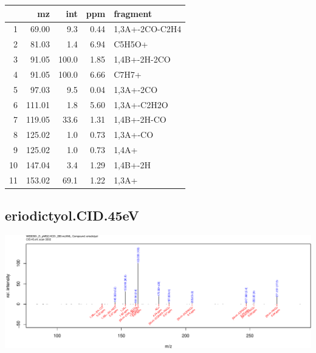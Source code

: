 \documentclass[]{article}
\begin{document}
\begin{table}[ht]
\centering
\begin{tabular}{rrrrl}
  \toprule
 & mz & int & ppm & fragment \\ 
  \midrule
1 & 69.00 & 9.3 & 0.44 & 1,3A+-2CO-C2H4 \\ 
  2 & 81.03 & 1.4 & 6.94 & C5H5O+ \\ 
  3 & 91.05 & 100.0 & 1.85 & 1,4B+-2H-2CO \\ 
  4 & 91.05 & 100.0 & 6.66 & C7H7+ \\ 
  5 & 97.03 & 9.5 & 0.04 & 1,3A+-2CO \\ 
  6 & 111.01 & 1.8 & 5.60 & 1,3A+-C2H2O \\ 
  7 & 119.05 & 33.6 & 1.31 & 1,4B+-2H-CO \\ 
  8 & 125.02 & 1.0 & 0.73 & 1,3A+-CO \\ 
  9 & 125.02 & 1.0 & 0.73 & 1,4A+ \\ 
  10 & 147.04 & 3.4 & 1.29 & 1,4B+-2H \\ 
  11 & 153.02 & 69.1 & 1.22 & 1,3A+ \\ 
   \bottomrule
\end{tabular}
\end{table}

\clearpage\subsection{eriodictyol.CID.45eV}
\includegraphics[width=\textwidth]{WEB350_files/figure-latex/unnamed-chunk-3-4}
\end{document}

